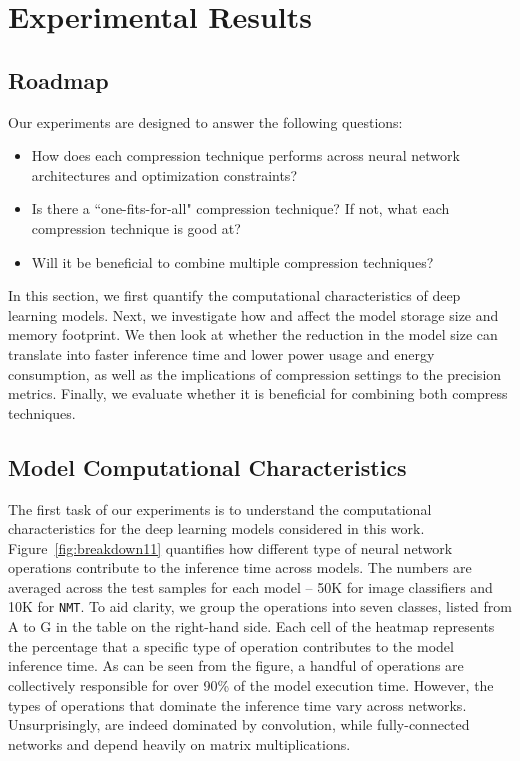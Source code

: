 \section{Experimental Results}


\subsection{Roadmap}
Our experiments are designed to answer the following questions:

\begin{itemize}
\item How does each compression technique performs across neural network architectures and optimization constraints?
\item Is there a ``one-fits-for-all" compression technique? If not, what each compression technique is good at?
\item Will it be beneficial to combine multiple compression techniques?
\end{itemize}

In this section, we first quantify the computational characteristics of deep learning models. Next, we investigate how \quantization and
\pruning affect the model storage size and memory footprint. We then look at whether the reduction in the model size can translate into
faster inference time and lower power usage and energy consumption, as well as the implications of compression settings to the precision
metrics. Finally, we evaluate whether it is beneficial for combining both compress techniques.
\subsection{Model Computational Characteristics}
The first task of our experiments is to understand the computational characteristics for the deep learning models considered in this work.
Figure~\ref{fig:breakdown11} quantifies how different type of neural network operations contribute to the inference time across models. The
numbers are averaged across the test samples for each model -- 50K for image classifiers and 10K for \texttt{NMT}. To aid clarity, we group
the operations into seven classes, listed from A to G in the table on the right-hand side. Each cell of the heatmap represents the
percentage that a specific type of operation contributes to the model inference time. As can be seen from the figure, a handful of
operations are collectively responsible for over 90\% of the model execution time. However, the types of operations that dominate the
inference time vary across networks. Unsurprisingly, \CNNs are indeed dominated by convolution, while fully-connected networks and \RNNs
depend heavily on matrix multiplications.

